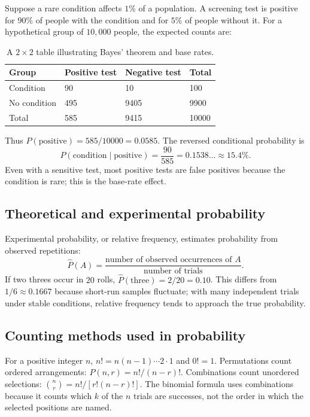 \documentclass[11pt]{article}
\begin{document}
Suppose a rare condition affects $1\%$ of a population.  A screening test is
positive for $90\%$ of people with the condition and for $5\%$ of people
without it.  For a hypothetical group of $10{,}000$ people, the expected
counts are:

\begin{table}[ht]
\centering
\caption{A $2\times2$ table illustrating Bayes' theorem and base rates.}\label{tab:bayes}
\begin{tabularx}{0.85\textwidth}{@{}lYYY@{}}
\toprule
Group & Positive test & Negative test & Total \\
\midrule
Condition & 90 & 10 & 100 \\
No condition & 495 & 9405 & 9900 \\
\midrule
Total & 585 & 9415 & 10000 \\
\bottomrule
\end{tabularx}
\end{table}

Thus $P(\text{positive})=585/10000=0.0585$.  The reversed conditional
probability is
\[
P(\text{condition}\mid\text{positive})=\frac{90}{585}=0.1538\ldots\approx15.4\%.
\]
Even with a sensitive test, most positive tests are false positives because
the condition is rare; this is the base-rate effect.

\subsection{Theoretical and experimental probability}
Experimental probability, or relative frequency, estimates probability from
observed repetitions:
\begin{equation}\label{eq:empirical-prob}
 \widehat{P}(A)=\frac{\text{number of observed occurrences of }A}
 {\text{number of trials}}.
\end{equation}
If two threes occur in $20$ rolls, $\widehat P(\text{three})=2/20=0.10$.
This differs from $1/6\approx0.1667$ because short-run samples fluctuate; with
many independent trials under stable conditions, relative frequency tends to
approach the true probability.

\subsection{Counting methods used in probability}
\begin{keybox}
For a positive integer $n$, $n!=n(n-1)\cdots2\cdot1$ and $0!=1$.
Permutations count ordered arrangements: $P(n,r)=n!/(n-r)!$.  Combinations
count unordered selections: $\binom nr=n!/[r!(n-r)!]$.  The binomial formula
uses combinations because it counts which $k$ of the $n$ trials are successes,
not the order in which the selected positions are named.
\end{keybox}
\end{document}

